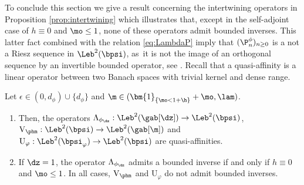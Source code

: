 To conclude this section we give a result concerning the intertwining operators in Proposition \ref{prop:intertwining} which illustrates that, except in the self-adjoint case of $h \equiv 0$ and $\mo \leq 1$, none of these operators admit bounded inverses. This latter fact combined with the relation \eqref{eq:LambdaP} imply that $(\P_n^\phi)_{n\geq0}$ is a not a Riesz sequence in $\Leb^2(\bpsi)$, as~it is not the image of an orthogonal sequence by an invertible bounded operator, see \cite{Christensen2003a}. Recall that a quasi-affinity is a linear operator between two Banach spaces with trivial kernel and dense range.

\begin{proposition}
\label{prop:quasi-similar}
Let $\epsilon \in (0,d_\phi) \cup \{d_\phi\}$ and $\m \in (\bm{1}_{\{\mo < 1+\h\}} + \mo ,\lam)$.
\begin{enumerate}
\item \label{item-1:prop:quasi-similar} Then, the operators $\Lambda_{\phi_{\dz}}:\Leb^2(\gab[\dz]) \to \Leb^2(\bpsi)$, $\mathrm{V}_{\phm}:\Leb^2(\bpsi)\to\Leb^2(\gab[\m])$ and $\mathrm{U}_\varphi:\Leb^2(\bpsi_\varphi) \to \Leb^2(\bpsi)$ are quasi-affinities.
\item \label{item-2:prop:quasi-similar}
If $\dz = 1$, the operator $\Lambda_{\phi_{\dz}}$ admits a bounded inverse if and only if $h \equiv 0$ and $\mo \leq 1$. In all cases, $\mathrm{V}_{\phm}$ and $\mathrm{U}_\varphi$ do not admit bounded inverses.
\end{enumerate}
\end{proposition}

